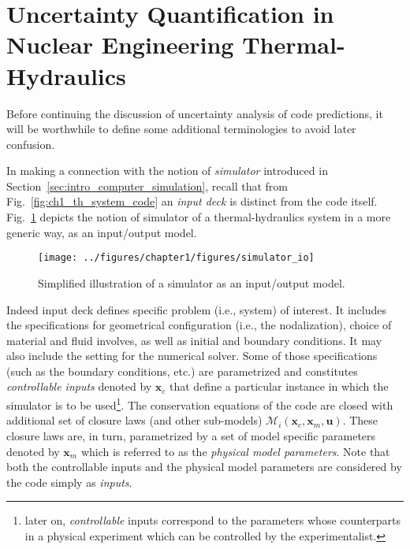 \section{Uncertainty Quantification in Nuclear Engineering Thermal-Hydraulics}\label{sec:intro_uncertainty_quantification}

Before continuing the discussion of uncertainty analysis of code predictions, it will be worthwhile to define some additional terminologies to avoid later confusion.

In making a connection with the notion of \emph{simulator} introduced in Section~\ref{sec:intro_computer_simulation}, 
recall that from Fig.~\ref{fig:ch1_th_system_code} an \emph{input deck} is distinct from the code itself.
Fig.~\ref{fig:ch1_simulator_io} depicts the notion of simulator of a thermal-hydraulics system in a more generic way, as an input/output model.
\begin{figure}[bth]	
	\centering
	\texttt{[image: ../figures/chapter1/figures/simulator\_io]}
	\caption[Simplified illustration of a simulator as an input/output model.]{Simplified illustration of a simulator as an input/output model.}
	\label{fig:ch1_simulator_io}
\end{figure}

Indeed input deck defines specific problem (i.e., system) of interest.
It includes the specifications for geometrical configuration (i.e., the nodalization), choice of material and fluid involves, as well as initial and boundary conditions.
It may also include the setting for the numerical solver.
Some of those specifications (such as the boundary conditions, etc.) are parametrized and constitutes \emph{controllable inputs} denoted by $\bm{x}_c$ that define a particular instance in which the simulator is to be used\footnote{later on, \emph{controllable} inputs correspond to the parameters whose counterparts in a physical experiment which can be controlled by the experimentalist.}.
The conservation equations of the code are closed with additional set of closure laws (and other sub-models) $\mathcal{M}_i(\bm{x}_c, \bm{x}_m, \bm{u})$.
These closure laws are, in turn, parametrized by a set of model specific parameters denoted by $\bm{x}_m$ which is referred to as the \emph{physical model parameters}.
Note that both the controllable inputs and the physical model parameters are considered by the code simply as \emph{inputs}.
 

